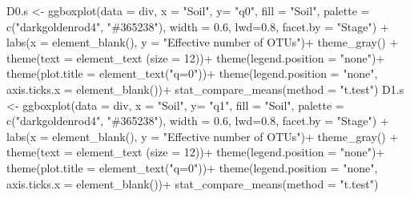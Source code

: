 \documentclass[]{interact}
\theoremstyle{plain}%
\theoremstyle{definition}
\theoremstyle{remark}
\newenvironment{Shaded}{\begin{snugshade}}{\end{snugshade}}
\newcommand{\AttributeTok}[1]{\textcolor[rgb]{0.77,0.63,0.00}{#1}}
\newcommand{\DecValTok}[1]{\textcolor[rgb]{0.00,0.00,0.81}{#1}}
\newcommand{\FloatTok}[1]{\textcolor[rgb]{0.00,0.00,0.81}{#1}}
\newcommand{\FunctionTok}[1]{\textcolor[rgb]{0.00,0.00,0.00}{#1}}
\newcommand{\NormalTok}[1]{#1}
\newcommand{\OtherTok}[1]{\textcolor[rgb]{0.56,0.35,0.01}{#1}}
\newcommand{\SpecialCharTok}[1]{\textcolor[rgb]{0.00,0.00,0.00}{#1}}
\newcommand{\StringTok}[1]{\textcolor[rgb]{0.31,0.60,0.02}{#1}}
\begin{document}
\begin{Shaded}
\begin{Highlighting}[]
\NormalTok{D0.s }\OtherTok{\textless{}{-}} \FunctionTok{ggboxplot}\NormalTok{(}\AttributeTok{data =}\NormalTok{ div, }\AttributeTok{x =} \StringTok{"Soil"}\NormalTok{, }\AttributeTok{y=} \StringTok{"q0"}\NormalTok{,}
                  \AttributeTok{fill =} \StringTok{"Soil"}\NormalTok{, }\AttributeTok{palette =} \FunctionTok{c}\NormalTok{(}\StringTok{"darkgoldenrod4"}\NormalTok{, }\StringTok{"\#365238"}\NormalTok{), }
                  \AttributeTok{width =} \FloatTok{0.6}\NormalTok{, }\AttributeTok{lwd=}\FloatTok{0.8}\NormalTok{, }\AttributeTok{facet.by =} \StringTok{"Stage"}\NormalTok{)  }\SpecialCharTok{+}
  \FunctionTok{labs}\NormalTok{(}\AttributeTok{x =} \FunctionTok{element\_blank}\NormalTok{(), }\AttributeTok{y =} \StringTok{"Effective number of OTUs"}\NormalTok{)}\SpecialCharTok{+}
  \FunctionTok{theme\_gray}\NormalTok{() }\SpecialCharTok{+}
  \FunctionTok{theme}\NormalTok{(}\AttributeTok{text =} \FunctionTok{element\_text}\NormalTok{ (}\AttributeTok{size =} \DecValTok{12}\NormalTok{))}\SpecialCharTok{+}
  \FunctionTok{theme}\NormalTok{(}\AttributeTok{legend.position =} \StringTok{"none"}\NormalTok{)}\SpecialCharTok{+}
  \FunctionTok{theme}\NormalTok{(}\AttributeTok{plot.title =} \FunctionTok{element\_text}\NormalTok{(}\StringTok{"q=0"}\NormalTok{))}\SpecialCharTok{+}
  \FunctionTok{theme}\NormalTok{(}\AttributeTok{legend.position =} \StringTok{"none"}\NormalTok{,}
        \AttributeTok{axis.ticks.x =} \FunctionTok{element\_blank}\NormalTok{())}\SpecialCharTok{+}
  \FunctionTok{stat\_compare\_means}\NormalTok{(}\AttributeTok{method =} \StringTok{"t.test"}\NormalTok{)}
\NormalTok{D1.s }\OtherTok{\textless{}{-}} \FunctionTok{ggboxplot}\NormalTok{(}\AttributeTok{data =}\NormalTok{ div, }\AttributeTok{x =} \StringTok{"Soil"}\NormalTok{, }\AttributeTok{y=} \StringTok{"q1"}\NormalTok{,}
                  \AttributeTok{fill =} \StringTok{"Soil"}\NormalTok{, }\AttributeTok{palette =} \FunctionTok{c}\NormalTok{(}\StringTok{"darkgoldenrod4"}\NormalTok{, }\StringTok{"\#365238"}\NormalTok{), }
                  \AttributeTok{width =} \FloatTok{0.6}\NormalTok{, }\AttributeTok{lwd=}\FloatTok{0.8}\NormalTok{, }\AttributeTok{facet.by =} \StringTok{"Stage"}\NormalTok{)  }\SpecialCharTok{+}
  \FunctionTok{labs}\NormalTok{(}\AttributeTok{x =} \FunctionTok{element\_blank}\NormalTok{(), }\AttributeTok{y =} \StringTok{"Effective number of OTUs"}\NormalTok{)}\SpecialCharTok{+}
  \FunctionTok{theme\_gray}\NormalTok{() }\SpecialCharTok{+}
  \FunctionTok{theme}\NormalTok{(}\AttributeTok{text =} \FunctionTok{element\_text}\NormalTok{ (}\AttributeTok{size =} \DecValTok{12}\NormalTok{))}\SpecialCharTok{+}
  \FunctionTok{theme}\NormalTok{(}\AttributeTok{legend.position =} \StringTok{"none"}\NormalTok{)}\SpecialCharTok{+}
  \FunctionTok{theme}\NormalTok{(}\AttributeTok{plot.title =} \FunctionTok{element\_text}\NormalTok{(}\StringTok{"q=0"}\NormalTok{))}\SpecialCharTok{+}
  \FunctionTok{theme}\NormalTok{(}\AttributeTok{legend.position =} \StringTok{"none"}\NormalTok{,}
        \AttributeTok{axis.ticks.x =} \FunctionTok{element\_blank}\NormalTok{())}\SpecialCharTok{+}
  \FunctionTok{stat\_compare\_means}\NormalTok{(}\AttributeTok{method =} \StringTok{"t.test"}\NormalTok{)}


\end{Highlighting}
\end{Shaded}
\end{document}
